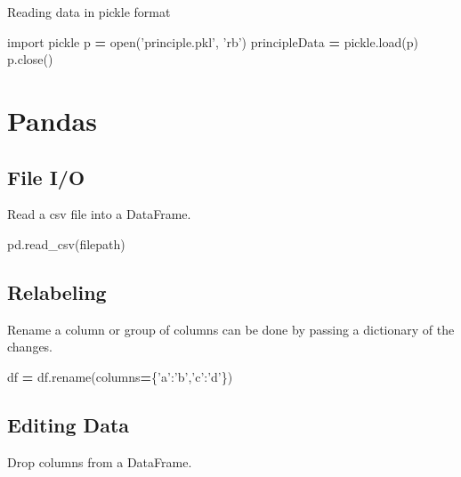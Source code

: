 \documentclass[]{book}
\newenvironment{Shaded}{\begin{snugshade}}{\end{snugshade}}
\newcommand{\StringTok}[1]{\textcolor[rgb]{0.31,0.60,0.02}{#1}}
\newcommand{\ImportTok}[1]{#1}
\newcommand{\OperatorTok}[1]{\textcolor[rgb]{0.81,0.36,0.00}{\textbf{#1}}}
\newcommand{\BuiltInTok}[1]{#1}
\newcommand{\NormalTok}[1]{#1}
\begin{document}
Reading data in pickle format

\begin{Shaded}
\begin{Highlighting}[]
\ImportTok{import}\NormalTok{ pickle}
\NormalTok{p }\OperatorTok{=} \BuiltInTok{open}\NormalTok{(}\StringTok{'principle.pkl'}\NormalTok{, }\StringTok{'rb'}\NormalTok{)}
\NormalTok{principleData }\OperatorTok{=}\NormalTok{ pickle.load(p)}
\NormalTok{p.close()}
\end{Highlighting}
\end{Shaded}

\chapter{Pandas}\label{pandas}

\section{File I/O}\label{file-io}

Read a csv file into a DataFrame.

\begin{Shaded}
\begin{Highlighting}[]
\NormalTok{pd.read_csv(filepath)}
\end{Highlighting}
\end{Shaded}

\section{Relabeling}\label{relabeling}

Rename a column or group of columns can be done by passing a dictionary
of the changes.

\begin{Shaded}
\begin{Highlighting}[]
\NormalTok{    df }\OperatorTok{=}\NormalTok{ df.rename(columns}\OperatorTok{=}\NormalTok{\{}\StringTok{'a'}\NormalTok{:}\StringTok{'b'}\NormalTok{,}\StringTok{'c'}\NormalTok{:}\StringTok{'d'}\NormalTok{\})}
\end{Highlighting}
\end{Shaded}

\section{Editing Data}\label{editing-data}

Drop columns from a DataFrame.
\end{document}
